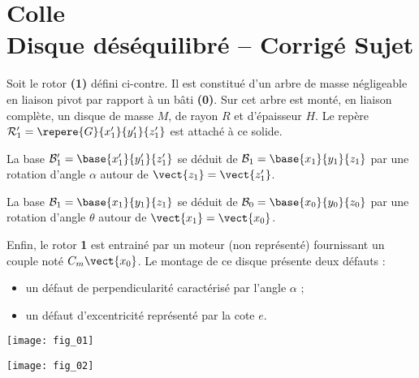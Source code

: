 \chapter*{Colle  \\ 
Disque déséquilibré -- \ifprof Corrigé \else Sujet \fi}

\iflivret {} \else
\ifprof  {} \else \fi
\fi

\setcounter{question}{0}



Soit le rotor \textbf{(1)} défini ci-contre. Il est constitué d'un arbre de masse négligeable en liaison pivot par rapport à un bâti \textbf{(0)}. Sur cet arbre est monté, en liaison complète, un disque de masse $M$, de rayon $R$ et d'épaisseur $H$. 
Le repère $\mathcal{R}'_1=\repere{G}{x_1'}{y_1'}{z_1'}$ est attaché à ce solide.

La base $\mathcal{B}'_1=\base{x_1'}{y_1'}{z_1'}$ se déduit de $\mathcal{B}_1=\base{x_1}{y_1}{z_1}$  par une rotation d'angle $\alpha$ autour de $\vect{z_1}= \vect{z_1'}$. 

La base $\mathcal{B}_1=\base{x_1}{y_1}{z_1}$ se déduit de $\mathcal{B}_0=\base{x_0}{y_0}{z_0}$  par une rotation d'angle $\theta$ autour de $\vect{x_1}= \vect{x_0}$. 

Enfin, le rotor \textbf{1} est entrainé par un moteur (non représenté) fournissant un couple noté $C_m\vect{x_0}$. 
Le montage de ce disque présente deux défauts :
\begin{itemize}
\item un défaut de perpendicularité caractérisé par l'angle $\alpha$ ;
\item un défaut d'excentricité représenté par la cote $e$.
\end{itemize}


\ifprof
\begin{marginfigure}
\texttt{[image: fig\_01]}
\end{marginfigure}
\begin{marginfigure}
\texttt{[image: fig\_02]}
\end{marginfigure}
\else

